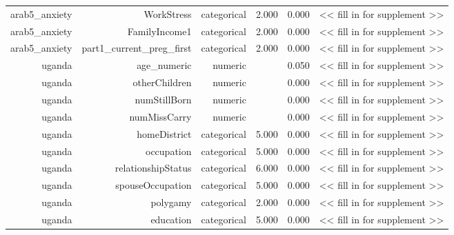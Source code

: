 \documentclass[10pt]{article}
\begin{document}
\begin{longtable}{rrrrrr}
arab5\_anxiety & WorkStress & categorical & 2.000 & 0.000 & << fill in for supplement >> \\
arab5\_anxiety & FamilyIncome1 & categorical & 2.000 & 0.000 & << fill in for supplement >> \\
arab5\_anxiety & part1\_current\_preg\_first & categorical & 2.000 & 0.000 & << fill in for supplement >> \\
uganda & age\_numeric & numeric &  & 0.050 & << fill in for supplement >> \\
uganda & otherChildren & numeric &  & 0.000 & << fill in for supplement >> \\
uganda & numStillBorn & numeric &  & 0.000 & << fill in for supplement >> \\
uganda & numMissCarry & numeric &  & 0.000 & << fill in for supplement >> \\
uganda & homeDistrict & categorical & 5.000 & 0.000 & << fill in for supplement >> \\
uganda & occupation & categorical & 5.000 & 0.000 & << fill in for supplement >> \\
uganda & relationshipStatus & categorical & 6.000 & 0.000 & << fill in for supplement >> \\
uganda & spouseOccupation & categorical & 5.000 & 0.000 & << fill in for supplement >> \\
uganda & polygamy & categorical & 2.000 & 0.000 & << fill in for supplement >> \\
uganda & education & categorical & 5.000 & 0.000 & << fill in for supplement >> \\
\bottomrule
\end{longtable}
\normalsize
\end{document}
